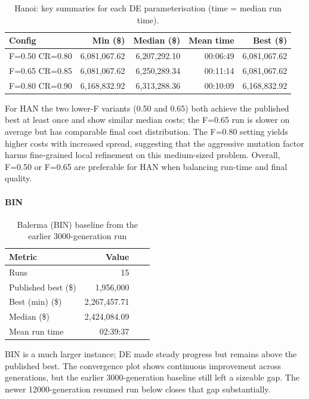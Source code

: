 \documentclass[12pt, a4paper]{article}
\begin{document}
\begin{table}[H]
	\centering
	\small
	\begin{tabular}{l r r r r}
		\hline
		Config         & Min (\$)     & Median (\$)  & Mean time & Best (\$)    \\
		\hline
		F=0.50 CR=0.80 & 6,081,067.62 & 6,207,292.10 & 00:06:49  & 6,081,067.62 \\
		F=0.65 CR=0.85 & 6,081,067.62 & 6,250,289.34 & 00:11:14  & 6,081,067.62 \\
		F=0.80 CR=0.90 & 6,168,832.92 & 6,313,288.36 & 00:10:09  & 6,168,832.92 \\
		\hline
	\end{tabular}
	\caption{Hanoi: key summaries for each DE parameterisation (time = median run time).}
\end{table}

For HAN the two lower-F variants (0.50 and 0.65) both achieve the published best at least once and show similar median costs; the F=0.65 run is slower on average but has comparable final cost distribution. The F=0.80 setting yields higher costs with increased spread, suggesting that the aggressive mutation factor harms fine-grained local refinement on this medium-sized problem. Overall, F=0.50 or F=0.65 are preferable for HAN when balancing run-time and final quality.

\paragraph{BIN}

\begin{table}[H]
	\centering
	\small
	\begin{tabular}{l r r r}
		\hline
		Metric              & Value        &  & \\
		\hline
		Runs                & 15           &  & \\
		Published best (\$) & 1,956,000    &  & \\
		Best (min) (\$)     & 2,267,457.71 &  & \\
		Median (\$)         & 2,424,084.09 &  & \\
		Mean run time       & 02:39:37     &  & \\
		\hline
	\end{tabular}
	\caption{Balerma (BIN) baseline from the earlier 3000-generation run}
\end{table}

BIN is a much larger instance; DE made steady progress but remains above the published best. The convergence plot shows continuous improvement across generations, but the earlier 3000-generation baseline still left a sizeable gap. The newer 12000-generation resumed run below closes that gap substantially.
\end{document}
